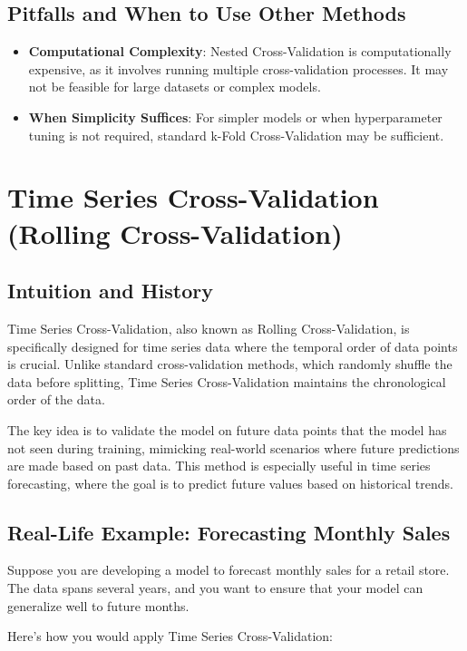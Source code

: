 \documentclass[10pt]{article}
\begin{document}
\subsection{Pitfalls and When to Use Other Methods}
\begin{itemize}
    \item \textbf{Computational Complexity}: Nested Cross-Validation is computationally expensive, as it involves running multiple cross-validation processes. It may not be feasible for large datasets or complex models.
    \item \textbf{When Simplicity Suffices}: For simpler models or when hyperparameter tuning is not required, standard k-Fold Cross-Validation may be sufficient.
\end{itemize}

\section{Time Series Cross-Validation (Rolling Cross-Validation)}
\subsection{Intuition and History}
Time Series Cross-Validation, also known as Rolling Cross-Validation, is specifically designed for time series data where the temporal order of data points is crucial. Unlike standard cross-validation methods, which randomly shuffle the data before splitting, Time Series Cross-Validation maintains the chronological order of the data.

The key idea is to validate the model on future data points that the model has not seen during training, mimicking real-world scenarios where future predictions are made based on past data. This method is especially useful in time series forecasting, where the goal is to predict future values based on historical trends.

\subsection{Real-Life Example: Forecasting Monthly Sales}
Suppose you are developing a model to forecast monthly sales for a retail store. The data spans several years, and you want to ensure that your model can generalize well to future months.

Here’s how you would apply Time Series Cross-Validation:
\end{document}

